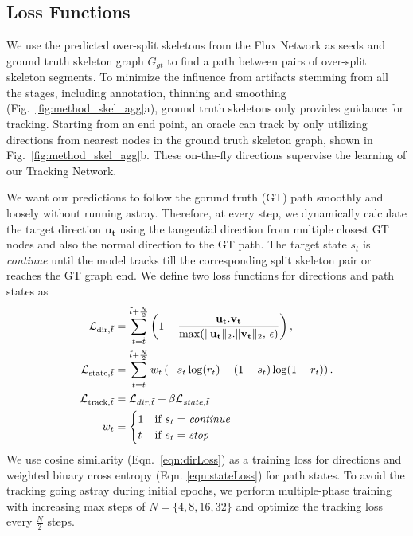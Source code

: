 \subsection{Loss Functions}
We use the predicted over-split skeletons from the Flux Network as seeds and ground truth skeleton graph $G_{gt}$ to find a path between pairs of over-split skeleton segments. 
To minimize the influence from artifacts stemming from all the stages, including annotation, thinning and smoothing (Fig.~\ref{fig:method_skel_agg}a), ground truth skeletons only provides guidance for tracking. Starting from an end point, an oracle can track by only utilizing directions from nearest nodes in the ground truth skeleton graph, shown in Fig.~\ref{fig:method_skel_agg}b. These on-the-fly directions supervise the learning of our Tracking Network.

We want our predictions to follow the gorund truth (GT) path smoothly and loosely without running astray. Therefore, at every step, we dynamically calculate the target direction $\mathbf{u_t}$ using the tangential direction from multiple closest GT nodes and also the normal direction to the GT path.
The target state $s_t$ is \textit{continue} until the model tracks till the corresponding split skeleton pair or reaches the GT graph end. We define two loss functions for directions and path states as 
\begin{align}
\mathcal{L}_{\text{dir}, \Tilde{t}}&= \sum_{t=\Tilde{t}}^{\Tilde{t} + \frac{N}{2}} \left( 1 - \frac{\mathbf{u_t}.\mathbf{v_t}}{\max(\|\mathbf{u_t}\|_2.\|\mathbf{v_t}\|_2,\,\epsilon)} \right), \label{eqn:dirLoss}\\
\mathcal{L}_{\text{state}, \Tilde{t}}&= \sum_{t=\Tilde{t}}^{\Tilde{t} + \frac{N}{2}} w_t \left( -s_t\log(r_t) - (1-s_t)\log(1-r_t) \right). \label{eqn:stateLoss}\\
\mathcal{L}_{\text{track}, \Tilde{t}} &= \mathcal{L}_{dir, \Tilde{t}} + \beta\mathcal{L}_{state, \Tilde{t}}\label{eqn:trackingLoss}\\
w_t&= \begin{cases}
1  & \text{if } s_t = \text{\textit{continue}} \\
t & \text{if } s_t = \text{\textit{stop}}
\end{cases}\label{eqn:trackingWeight}
\end{align}
We use cosine similarity (Eqn.~\eqref{eqn:dirLoss}) as a training loss for directions and weighted binary cross entropy (Eqn. \eqref{eqn:stateLoss}) for path states. To avoid the tracking going astray during initial epochs, we perform multiple-phase training with increasing max steps of $N=\{4, 8, 16, 32\}$ and optimize the tracking loss every $\frac{N}{2}$ steps.

